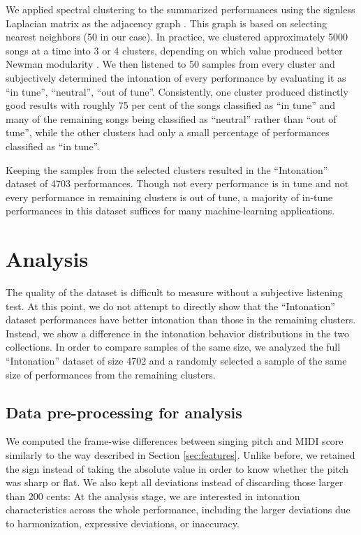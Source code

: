 We applied spectral clustering to the summarized performances using the signless Laplacian matrix as the adjacency graph \cite{lucinska2012spectral}. This graph is based on selecting nearest neighbors (50 in our case). In practice, we clustered approximately 5000 songs at a time into 3 or 4 clusters, depending on which value produced better Newman modularity \cite{newman2006modularity}. We then listened to 50 samples from every cluster and subjectively determined the intonation of every performance by evaluating it as ``in tune'', ``neutral'', ``out of tune''. Consistently, one cluster produced distinctly good results with roughly 75 per cent of the songs classified as ``in tune'' and many of the remaining songs being classified as ``neutral'' rather than ``out of tune'', while the other clusters had only a small percentage of performances classified as ``in tune''. 

Keeping the samples from the selected clusters resulted in the ``Intonation'' dataset of 4703 performances. Though not every performance is in tune and not every performance in remaining clusters is out of tune, a majority of in-tune performances in this dataset suffices for many machine-learning applications.

\section{Analysis}

The quality of the dataset is difficult to measure without a subjective listening test. At this point, we do not attempt to directly show that the ``Intonation'' dataset performances have better intonation than those in the remaining clusters. Instead, we show a difference in the intonation behavior distributions in the two collections. In order to compare samples of the same size, we analyzed the full ``Intonation'' dataset of size 4702 and a randomly selected a sample of the same size of performances from the remaining clusters.

\subsection{Data pre-processing for analysis}
We computed the frame-wise differences between singing pitch and MIDI score similarly to the way described in Section \ref{sec:features}. Unlike before, we retained the sign instead of taking the absolute value in order to know whether the pitch was sharp or flat. We also kept all deviations instead of discarding those larger than 200 cents: At the analysis stage, we are interested in intonation characteristics across the whole performance, including the larger deviations due to harmonization, expressive deviations, or inaccuracy. 

